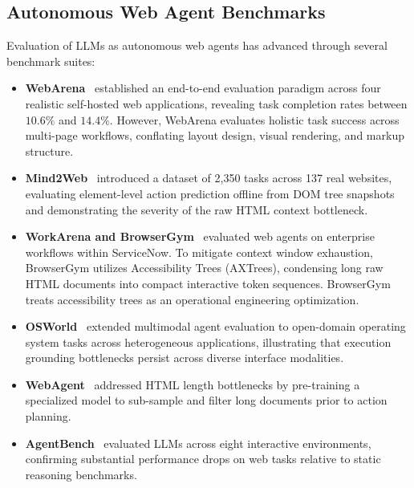 \documentclass[11pt,a4paper]{article}
\begin{document}
\subsection{Autonomous Web Agent Benchmarks}
Evaluation of LLMs as autonomous web agents has advanced through several benchmark suites:
\begin{itemize}
    \item \textbf{WebArena}~\cite{zhou2024webarena} established an end-to-end evaluation paradigm across four realistic self-hosted web applications, revealing task completion rates between $10.6\%$ and $14.4\%$. However, WebArena evaluates holistic task success across multi-page workflows, conflating layout design, visual rendering, and markup structure.
    \item \textbf{Mind2Web}~\cite{deng2023mind2web} introduced a dataset of 2,350 tasks across 137 real websites, evaluating element-level action prediction offline from DOM tree snapshots and demonstrating the severity of the raw HTML context bottleneck.
    \item \textbf{WorkArena and BrowserGym}~\cite{drouin2024workarena, workarenapp2024} evaluated web agents on enterprise workflows within ServiceNow. To mitigate context window exhaustion, BrowserGym utilizes Accessibility Trees (AXTrees), condensing long raw HTML documents into compact interactive token sequences. BrowserGym treats accessibility trees as an operational engineering optimization.
    \item \textbf{OSWorld}~\cite{osworld2024} extended multimodal agent evaluation to open-domain operating system tasks across heterogeneous applications, illustrating that execution grounding bottlenecks persist across diverse interface modalities.
    \item \textbf{WebAgent}~\cite{gur2024webagent} addressed HTML length bottlenecks by pre-training a specialized model to sub-sample and filter long documents prior to action planning.
    \item \textbf{AgentBench}~\cite{liu2024agentbench} evaluated LLMs across eight interactive environments, confirming substantial performance drops on web tasks relative to static reasoning benchmarks.
\end{itemize}
\end{document}
